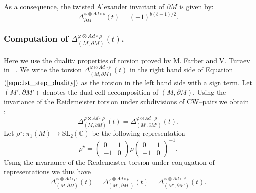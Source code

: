 \documentclass[a4paper]{amsart}
\theoremstyle{plain}
\theoremstyle{definition}
\theoremstyle{remark}
\newcommand{\CC}{{\mathbb C}}
\newcommand{\SL}{{\mathrm{SL}_2(\CC)}}
\newcommand{\PolyTors}[2]{\Delta_{#1}^{#2}}
\newcommand{\otAd}[2]{#1 \otimes Ad \circ #2}
\newcommand{\bord}{\partial}
\begin{document}
As a consequence, the twisted Alexander invariant of $\partial M$ is given by:
\begin{equation}\label{Eq:torsionbound}
\PolyTors{\bord M}{\otAd{\varphi}{\rho}}(t) = (-1)^{b(b-1)/2}.
\end{equation}

\subsubsection{Computation of $\PolyTors{(M, \bord M)}{\otAd{\varphi}{\rho}}(t)$.}
Here we use the duality properties of torsion proved by M. Farber and
V. Turaev in ~\cite{FarberTuraev:PR_metric}. We write the torsion
$\PolyTors{(M, \bord M)}{\otAd{\varphi}{\rho}}(t)$ in the right hand
side of Equation~$(\ref{eqn:1st_step_duality})$ as the torsion in the left
hand side with a sign term. Let $(M', \bord M')$ denotes the dual cell
decomposition of $(M, \bord M)$. Using the invariance of the Reidemeister torsion under
subdivisions of CW--pairs we obtain :
\[
\PolyTors{(M, \bord M)}{\otAd{\varphi}{\rho}}(t) = \PolyTors{(M',
  \bord M')}{\otAd{\varphi}{\rho}}(t).
\]
Let ${\rho}^{\star}\colon \pi_1(M) \to \SL$ be the following
representation
\[
{\rho}^{\star} = \left(
  \begin{smallmatrix}
    0 & 1\\
    -1& 0
  \end{smallmatrix}
\right)\rho \left(
  \begin{smallmatrix}
    0 & 1\\
    -1& 0
  \end{smallmatrix}
\right)^{-1}.
\]
Using the invariance of the Reidemeister torsion under conjugation of representations
we thus have
\[
  \PolyTors{(M, \bord M)}{\otAd{\varphi}{\rho}}(t)
  = \PolyTors{(M', \bord M')}{\otAd{\varphi}{\rho}}(t) 
  = \PolyTors{(M', \bord
    M')}{\otAd{\varphi}{{\rho}^{\star}}}(t).
\]
\end{document}
